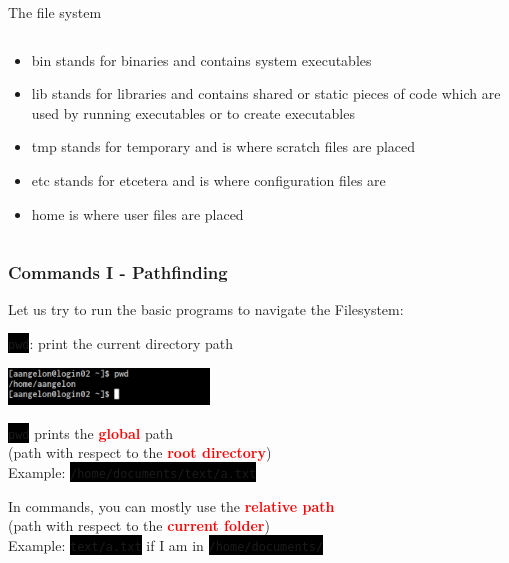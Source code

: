 \documentclass[unknownkeysallowed, 10pt, a4 paper, handout]{beamer}
\newcommand{\focus}[1]{\textbf{\textcolor{red}{#1}}}
\newcommand{\code}[1]{\colorbox{black}{\color{green}\texttt{#1}}}
\begin{document}
\begin{frame}[label=filesystem]{The file system}
\begin{columns}[T]
\begin{column}{.73\textwidth}
{\begin{itemize}
        \item bin stands for binaries and contains system executables
        \item lib stands for libraries and contains shared or static pieces of
          code which are used by running executables or to create executables
        \item tmp stands for temporary and is where scratch files are placed
        \item etc stands for etcetera and is where configuration files are
        \item home is where user files are placed
      \end{itemize}
    }
    \end{column}
  \end{columns}
\end{frame}


\begin{frame}[c]
  \frametitle{Commands I - Pathfinding}
  Let us try to run the basic programs to navigate the Filesystem:
  \begin{center}
    \vspace{2pt}

    \code{pwd}: print the current directory path
    \vspace{-4mm}

    \begin{center}
      \includegraphics[width=0.40\textwidth]{pics/pwd.png}
    \end{center}
    \vspace{4mm}

    \code{pwd} prints the \focus{global} path\\
    (path with respect to the \focus{root directory})\\
    Example: \code{/home/documents/text/a.txt}
    \vspace{4mm}

    In commands, you can mostly use the \focus{relative path}\\
    (path with respect to the \focus{current folder})\\
    Example: \code{text/a.txt} if I am in \code{/home/documents/}
  \end{center}
\end{frame}
\end{document}
